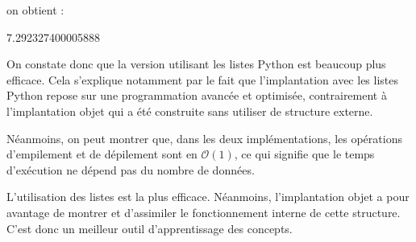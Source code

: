 \documentclass[
  letterpaper,
  DIV=11,
  numbers=noendperiod]{scrartcl}
\newenvironment{Shaded}{\begin{snugshade}}{\end{snugshade}}
\newcommand{\FloatTok}[1]{\textcolor[rgb]{0.68,0.00,0.00}{#1}}
\begin{document}
\begin{tcolorbox}
on obtient :

\begin{Shaded}
\begin{Highlighting}[]
\FloatTok{7.292327400005888}
\end{Highlighting}
\end{Shaded}

On constate donc que la version utilisant les listes Python est beaucoup
plus efficace. Cela s'explique notamment par le fait que l'implantation
avec les listes Python repose sur une programmation avancée et
optimisée, contrairement à l'implantation objet qui a été construite
sans utiliser de structure externe.

Néanmoins, on peut montrer que, dans les deux implémentations, les
opérations d'empilement et de dépilement sont en \(\mathcal{O}(1)\), ce
qui signifie que le temps d'exécution ne dépend pas du nombre de
données.

L'utilisation des listes est la plus efficace. Néanmoins, l'implantation
objet a pour avantage de montrer et d'assimiler le fonctionnement
interne de cette structure. C'est donc un meilleur outil d'apprentissage
des concepts.

\end{tcolorbox}
\end{document}

